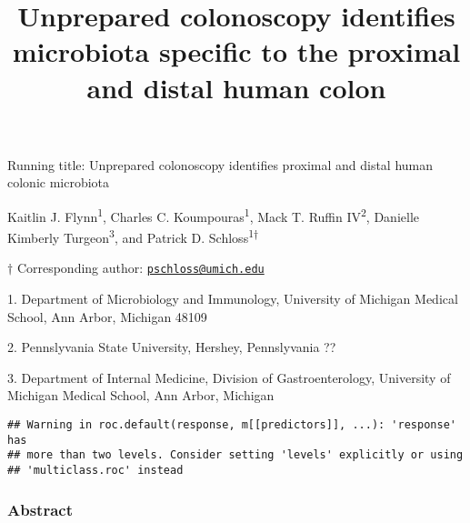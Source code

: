 \documentclass[11pt,]{article}
\title{Unprepared colonoscopy identifies microbiota specific to the proximal
and distal human colon}
\author{}
\date{}
\begin{document}
\maketitle

\vspace{35mm}

Running title: Unprepared colonoscopy identifies proximal and distal
human colonic microbiota

\vspace{35mm}

Kaitlin J. Flynn\textsuperscript{1}, Charles C.
Koumpouras\textsuperscript{1}, Mack T. Ruffin IV\textsuperscript{2},
Danielle Kimberly Turgeon\textsuperscript{3}, and Patrick D.
Schloss\textsuperscript{1\(\dagger\)}

\vspace{35mm}

\(\dagger\) Corresponding author:
\href{mailto:pschloss@umich.edu}{\nolinkurl{pschloss@umich.edu}}

1. Department of Microbiology and Immunology, University of Michigan
Medical School, Ann Arbor, Michigan 48109

2. Pennslyvania State University, Hershey, Pennslyvania ??

3. Department of Internal Medicine, Division of Gastroenterology,
University of Michigan Medical School, Ann Arbor, Michigan

\newpage

\begin{verbatim}
## Warning in roc.default(response, m[[predictors]], ...): 'response' has
## more than two levels. Consider setting 'levels' explicitly or using
## 'multiclass.roc' instead
\end{verbatim}

\subsubsection{Abstract}\label{abstract}
\end{document}

